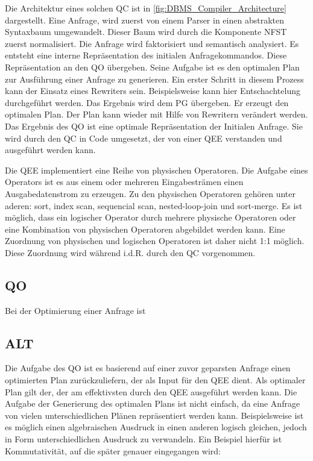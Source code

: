 Die Architektur eines solchen \ac{QC} ist in \ref{fig:DBMS_Compiler_Architecture} dargestellt. Eine Anfrage, wird zuerst von einem Parser in einen abstrakten Syntaxbaum umgewandelt. Dieser Baum wird durch die Komponente NFST zuerst normalisiert. Die Anfrage wird faktorisiert und semantisch analysiert. Es entsteht eine interne Repräsentation des initialen Anfragekommandos. Diese Repräsentation an den \ac{QO} übergeben. Seine Aufgabe ist es den optimalen Plan zur Ausführung einer Anfrage zu generieren. Ein erster Schritt in diesem Prozess kann der Einsatz eines Rewriters sein. Beispielsweise kann hier Entschachtelung durchgeführt werden. Das Ergebnis wird dem \ac{PG} übergeben. Er erzeugt den optimalen Plan. Der Plan kann wieder mit Hilfe von Rewritern verändert werden. Das Ergebnis des \ac{QO} ist eine optimale Repräsentation der Initialen Anfrage. Sie wird durch den \ac{QC} in Code umgesetzt, der von einer \ac{QEE} verstanden und ausgeführt werden kann.


Die \ac{QEE} implementiert eine Reihe von physischen Operatoren. Die Aufgabe eines Operators ist es aus einem oder mehreren Eingabesträmen einen Ausgabedatenstrom zu erzeugen. Zu den physischen Operatoren gehören unter aderen: sort, index scan, sequencial scan, nested-loop-join und sort-merge. Es ist möglich, dass ein logischer Operator durch mehrere physische Operatoren oder eine Kombination von physischen Operatoren abgebildet werden kann. Eine Zuordnung von physischen und logischen Operatoren ist daher nicht 1:1 möglich. Diese Zuordnung wird während i.d.R. durch den \ac{QC} vorgenommen.


\subsection{\ac{QO}}

Bei der Optimierung einer Anfrage ist 


\newpage
\subsection{ALT}




Die Aufgabe des QO ist es basierend auf einer zuvor geparsten Anfrage einen optimierten Plan zurückzuliefern, der als Input für den QEE dient. Als optimaler Plan gilt der, der am effektivsten durch den QEE ausgeführt werden kann. Die Aufgabe der Generierung des optimalen Plans ist nicht einfach, da eine Anfrage von vielen unterschiedlichen Plänen repräsentiert werden kann. Beispielsweise ist es möglich einen algebraischen Ausdruck in einen anderen logisch gleichen, jedoch in Form unterschiedlichen Ausdruck zu verwandeln. Ein Beispiel hierfür ist Kommutativität, auf die später genauer eingegangen wird:

